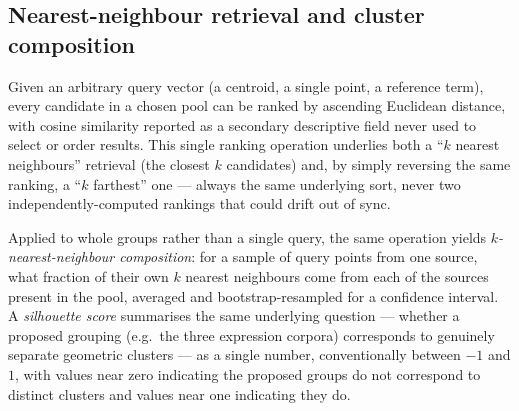 \subsection{Nearest-neighbour retrieval and cluster composition}
Given an arbitrary query vector (a centroid, a single point, a reference term), every candidate in a chosen pool can be ranked by ascending Euclidean distance, with cosine similarity reported as a secondary descriptive field never used to select or order results. This single ranking operation underlies both a \enquote{$k$ nearest neighbours} retrieval (the closest $k$ candidates) and, by simply reversing the same ranking, a \enquote{$k$ farthest} one — always the same underlying sort, never two independently-computed rankings that could drift out of sync.

Applied to whole groups rather than a single query, the same operation yields \textit{$k$-nearest-neighbour composition}: for a sample of query points from one source, what fraction of their own $k$ nearest neighbours come from each of the sources present in the pool, averaged and bootstrap-resampled for a confidence interval. A \textit{silhouette score} summarises the same underlying question — whether a proposed grouping (e.g.\ the three expression corpora) corresponds to genuinely separate geometric clusters — as a single number, conventionally between $-1$ and $1$, with values near zero indicating the proposed groups do not correspond to distinct clusters and values near one indicating they do.

